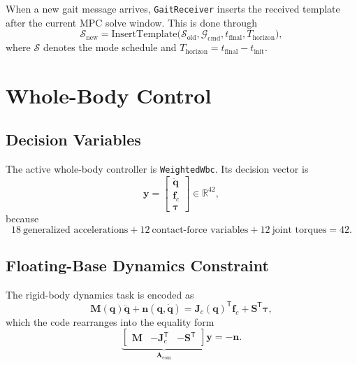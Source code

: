 \documentclass[11pt,a4paper]{article}
\newcommand{\R}{\mathbb{R}}
\newcommand{\vect}[1]{\bm{#1}}
\newcommand{\mat}[1]{\bm{#1}}
\newcommand{\trans}{^{\mathsf T}}
\newcommand{\code}[1]{\texttt{#1}}
\begin{document}
When a new gait message arrives, \code{GaitReceiver} inserts the received template after the current MPC solve window. This is done through
\begin{equation}
\mathcal{S}_{\mathrm{new}} = \mathrm{InsertTemplate}\big(\mathcal{S}_{\mathrm{old}}, \mathcal{G}_{\mathrm{cmd}}, t_{\mathrm{final}}, T_{\mathrm{horizon}}\big),
\end{equation}
where \(\mathcal{S}\) denotes the mode schedule and \(T_{\mathrm{horizon}} = t_{\mathrm{final}} - t_{\mathrm{init}}\).

\section{Whole-Body Control}
\subsection{Decision Variables}
The active whole-body controller is \code{WeightedWbc}. Its decision vector is
\begin{equation}
\vect{y} =
\begin{bmatrix}
\ddot{\vect{q}} \\
\vect{f}_c \\
\vect{\tau}
\end{bmatrix}
\in \R^{42},
\end{equation}
because
\begin{equation}
18\ \text{generalized accelerations}
+ 12\ \text{contact-force variables}
+ 12\ \text{joint torques}
= 42.
\end{equation}

\subsection{Floating-Base Dynamics Constraint}
The rigid-body dynamics task is encoded as
\begin{equation}
\mat{M}(\vect{q}) \ddot{\vect{q}} + \vect{n}(\vect{q},\dot{\vect{q}})
= \mat{J}_c(\vect{q})\trans \vect{f}_c + \mat{S}\trans \vect{\tau},
\end{equation}
which the code rearranges into the equality form
\begin{equation}
\underbrace{
\begin{bmatrix}
\mat{M} & -\mat{J}_c\trans & -\mat{S}\trans
\end{bmatrix}}_{\mat{A}_{\mathrm{eom}}}
\vect{y}

=
-
\vect{n}.
\end{equation}
\end{document}
